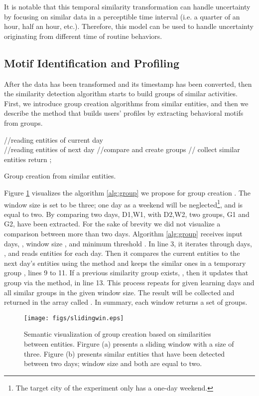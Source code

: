 \documentclass{sig-alternate}
\begin{document}
It is notable that this temporal similarity transformation can handle uncertainty by focusing on similar data in a perceptible time interval (i.e. a quarter of an hour, half an hour, etc.). Therefore, this model can be used to handle uncertainty originating from different time of routine behaviors.
\subsection{Motif Identification and Profiling}
After the data has been transformed and its timestamp has been converted, then the similarity detection algorithm starts to build groups of similar activities. First, we introduce group creation algorithms from similar entities, and then we describe the method that builds users' profiles by extracting behavioral motifs from groups.
\begin{algorithm2e}[htb]
\scriptsize
 \KwData{, ,}
   \;
   \;
 \While{()} { 	
	 //reading entities of current day  \\
      \;
     //reading entities of next day  \;
      \;	
	 //compare and create groups	  \;
	 \;
	// collect similar entities \;
	 \;
 	\If{()} {
 		   \;
 		    \;
 	  } \Else {
 			 \;
 	  }			
  } 
 return 	;
 \caption{\footnotesize Group creation from similar entities.}\label{alg:group}
\end{algorithm2e}
\normalsize
Figure \ref{fig:slwin} visualizes the algorithm \ref{alg:group} we propose for group creation . The window size is set to be three; one day as a weekend will be neglected\footnote{\small{The target city of the experiment only has a one-day weekend.}}, and  is equal to two. By comparing two days, D1,W1, with D2,W2, two groups, G1 and G2, have been extracted. For the sake of brevity we did not visualize a comparison between more than two days. Algorithm \ref{alg:group} receives input days, , window size , and minimum threshold . In line 3, it iterates through days, , and reads entities for each day. Then it compares the current entities to the next day's entities using the  method and keeps the similar ones in a temporary group , lines 9 to 11. If a previous similarity group exists, , then it updates that group via the  method, in line 13. This process repeats for given learning days and all similar groups in the given window size. The result will be collected and returned in the array called . In summary, each window returns a set of groups.\\
\begin{figure}[htb]
\texttt{[image: figs/slidingwin.eps]} 
\vspace{-0.2cm}
\caption{\small Semantic visualization of group creation based on similarities between entities. Firgure (a) presents a sliding window with a size of three. Figure (b) presents similar entities that have been detected between two days; window size and  both are equal to two.}\label{fig:slwin}
\vspace{-0.1cm}
\end{figure}
\end{document}
